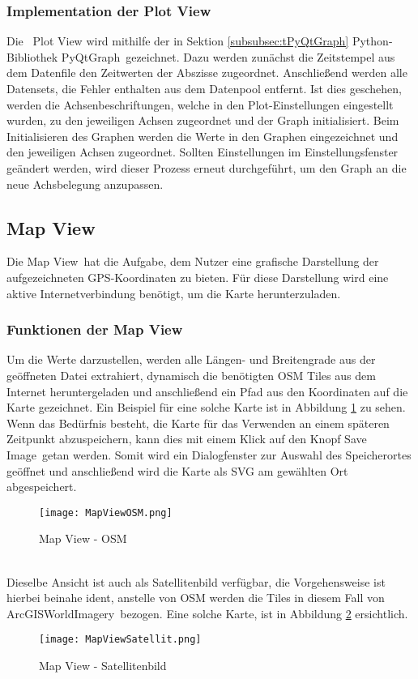 \subsubsection{Implementation der Plot View}
\label{subsubsec:PlotViewImplementation}
Die \grqq\ Plot View \glqq wird mithilfe der in Sektion \ref{subsubsec:tPyQtGraph} Python-Bibliothek \glqq PyQtGraph\grqq \ gezeichnet. Dazu werden zunächst die Zeitstempel aus dem Datenfile den Zeitwerten der Abszisse zugeordnet. Anschließend werden alle Datensets, die Fehler enthalten aus dem Datenpool entfernt. Ist dies geschehen, werden die Achsenbeschriftungen, welche in den Plot-Einstellungen eingestellt wurden, zu den jeweiligen Achsen zugeordnet und der Graph initialisiert. Beim Initialisieren des Graphen werden die Werte in den Graphen eingezeichnet und den jeweiligen Achsen zugeordnet. Sollten Einstellungen im Einstellungsfenster geändert werden, wird dieser Prozess erneut durchgeführt, um den Graph an die neue Achsbelegung anzupassen.
\subsection{Map View}
\label{subsec:VisMapView}
Die \glqq Map View\grqq\ hat die Aufgabe, dem Nutzer eine grafische Darstellung der aufgezeichneten \ac{GPS}-Koordinaten zu bieten. Für diese Darstellung wird eine aktive Internetverbindung benötigt, um die Karte herunterzuladen.
\subsubsection{Funktionen der Map View}
\label{subsubsec:MapViewFunktion}
Um die Werte darzustellen, werden alle Längen- und Breitengrade aus der geöffneten Datei extrahiert, dynamisch die benötigten \ac{OSM} Tiles aus dem Internet heruntergeladen und anschließend ein Pfad aus den Koordinaten auf die Karte gezeichnet. Ein Beispiel für eine solche Karte ist in Abbildung 
\ref{fig:OSMMapView} zu sehen. Wenn das Bedürfnis besteht, die Karte für das Verwenden an einem späteren Zeitpunkt abzuspeichern, kann dies mit einem Klick auf den Knopf \glqq Save Image\grqq\ getan werden. Somit wird ein Dialogfenster zur Auswahl des Speicherortes geöffnet und anschließend wird die Karte als \ac{SVG} am gewählten Ort abgespeichert.
\begin{figure}[h]
\centering
\texttt{[image: MapViewOSM.png]}
\caption{Map View - \ac{OSM}}
\label{fig:OSMMapView}
\end{figure}
\\
Dieselbe Ansicht ist auch als Satellitenbild verfügbar, die Vorgehensweise ist hierbei beinahe ident, anstelle von \ac{OSM} werden die Tiles in diesem Fall von \glqq ArcGISWorldImagery\grqq\ bezogen. Eine solche Karte, ist in Abbildung \ref{fig:SatteliteMapView} ersichtlich. 
\begin{figure}[h]
\centering
\texttt{[image: MapViewSatellit.png]}
\caption{Map View - Satellitenbild}
\label{fig:SatteliteMapView}
\end{figure}

